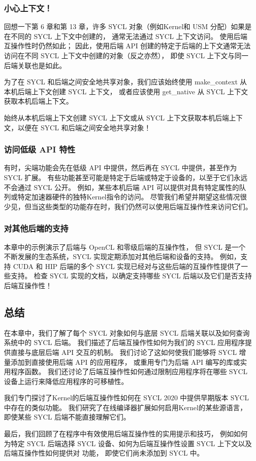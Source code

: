 \subsubsection{小心上下文！}
回想一下第 6 章和第 13 章，许多 SYCL 对象（例如Kernel和 USM 分配）如果是在不同的 SYCL 上下文中创建的，
通常无法通过 SYCL 上下文访问。 使用后端互操作性时仍然如此； 
因此，使用后端 API 创建的特定于后端的上下文通常无法访问在不同 SYCL 上下文中创建的对象（反之亦然），
即使 SYCL 上下文与同一后端关联也是如此。

为了在 SYCL 和后端之间安全地共享对象，我们应该始终使用 make\_context 从本机后端上下文创建 SYCL 上下文，
或者应该使用 get\_native 从 SYCL 上下文获取本机后端上下文。

\begin{remark}
	始终从本机后端上下文创建 SYCL 上下文或从 SYCL 上下文获取本机后端上下文，以便在 SYCL 和后端之间安全地共享对象！
\end{remark}

\subsubsection{访问低级 API 特性}
有时，尖端功能会先在低级 API 中提供，然后再在 SYCL 中提供，甚至作为 SYCL 扩展。 
有些功能甚至可能是特定于后端或特定于设备的，以至于它们永远不会通过 SYCL 公开。 
例如，某些本机后端 API 可以提供对具有特定属性的队列或特定加速器硬件的独特Kernel指令的访问。 
尽管我们希望并期望这些情况很少见，但当这些类型的功能存在时，我们仍然可以使用后端互操作性来访问它们。

\subsubsection{对其他后端的支持}
本章中的示例演示了后端与 OpenCL 和零级后端的互操作性，
但 SYCL 是一个不断发展的生态系统，SYCL 实现定期添加对其他后端和设备的支持。 
例如，支持 CUDA 和 HIP 后端的多个 SYCL 实现已经对与这些后端的互操作性提供了一些支持。 
检查 SYCL 实现的文档，以确定支持哪些 SYCL 后端以及它们是否支持后端互操作性！

\subsection{总结}
在本章中，我们了解了每个 SYCL 对象如何与底层 SYCL 后端关联以及如何查询系统中的 SYCL 后端。 
我们描述了后端互操作性如何为我们的 SYCL 应用程序提供直接与底层后端 API 交互的机制。 
我们讨论了这如何使我们能够将 SYCL 增量添加到直接使用后端 API 的应用程序，
或重用专门为后端 API 编写的库或实用程序函数。 
我们还讨论了后端互操作性如何通过限制应用程序将在哪些 SYCL 设备上运行来降低应用程序的可移植性。

我们专门探讨了Kernel的后端互操作性如何在 SYCL 2020 中提供早期版本 SYCL 中存在的类似功能。 
我们研究了在线编译器扩展如何启用Kernel的某些源语言，即使某些 SYCL 后端不能直接理解它们。

最后，我们回顾了在程序中有效使用后端互操作性的实用提示和技巧，
例如如何为特定 SYCL 后端选择 SYCL 设备、如何为后端互操作性设置 SYCL 上下文以及后端互操作性如何提供对 功能，
即使它们尚未添加到 SYCL 中。